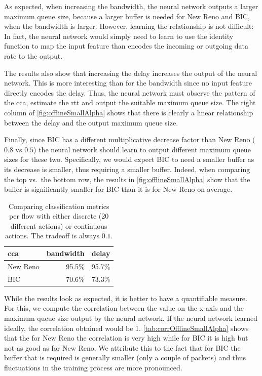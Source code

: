 \documentclass[10pt,sigconf,letterpaper,anonymous]{acmart}
\begin{document}
As expected, when increasing the bandwidth, the neural network outputs a larger maximum queue size, because a larger buffer is needed for New Reno and BIC, when the bandwidth is larger. However, learning the relationship is not difficult: In fact, the neural network would simply need to learn to use the identity function to map the input feature than encodes the incoming or outgoing data rate to the output. 

The results also show that increasing the delay increases the output of the neural network. This is more interesting than for the bandwidth since no input feature directly encodes the delay. Thus, the neural network must observe the pattern of the \gls{cca}, estimate the \gls{rtt} and output the suitable maximum queue size. The right column of \autoref{fig:offlineSmallAlpha} shows that there is clearly a linear relationship between the delay and the output maximum queue size. 

Finally, since BIC has a different multiplicative decrease factor than New Reno ($0.8$ vs $0.5$) the neural network should learn to output different maximum queue sizes for these two. Specifically, we would expect BIC to need a smaller buffer as its decrease is smaller, thus requiring a smaller buffer. Indeed, when comparing the top vs.~the bottom row, the results in \autoref{fig:offlineSmallAlpha} show that the buffer is significantly smaller for BIC than it is for New Reno on average. 

\begin{table}[h]
\caption{Comparing classification metrics per flow with either discrete (20 different actions) or continuous actions. The tradeoff is always $0.1$.} \label{tab:corrOfflineSmallAlpha}
\centering
\begin{tabular}{lrr} \toprule
\gls{cca} & bandwidth & delay \\ \midrule
New Reno & 95.5\% & 95.7\% \\
BIC & 70.6\% & 73.3\% \\
\bottomrule
\end{tabular}
\end{table}

While the results look as expected, it is better to have a quantifiable measure. For this, we compute the correlation between the value on the x-axis and the maximum queue size output by the neural network. If the neural network learned ideally, the correlation obtained would be 1. \autoref{tab:corrOfflineSmallAlpha} shows that the for New Reno the correlation is very high while for BIC it is high but not as good as for New Reno. We attribute this to the fact that for BIC the buffer that is required is generally smaller (only a couple of packets) and thus fluctuations in the training process are more pronounced. 
\end{document}
